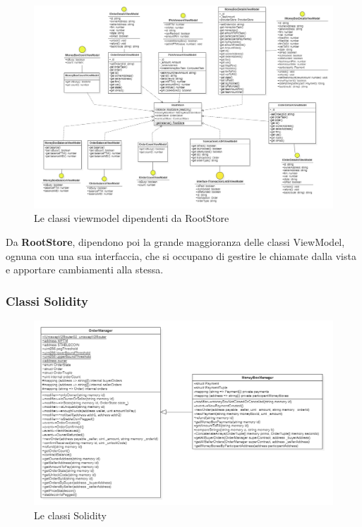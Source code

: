 \begin{landscape}
\begin{figure}[H]
    \centering
    \includegraphics[scale = 0.6]{immagini/rsviewmodel.png}
    \caption{Le classi viewmodel dipendenti da RootStore}
\end{figure}
\end{landscape}

Da \textbf{RootStore}, dipendono poi la grande maggioranza delle classi ViewModel, ognuna con una sua interfaccia, che si occupano di gestire le chiamate dalla vista e apportare cambiamenti alla stessa.

\subsubsection{Classi Solidity}

\begin{figure}[H]
    \centering
    \includegraphics[scale = 0.5]{immagini/solidity.png}
    \caption{Le classi Solidity}
\end{figure}

